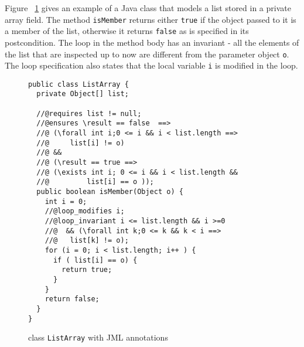 Figure ~\ref{halfSrc} gives an example of a Java class that models a list stored in a private array field. 
The method \texttt{isMember} returns either \texttt{true} if the object passed to it is a member of the list, otherwise 
it returns \texttt{false} as is specified in its postcondition. The loop in the method body has an invariant - all
the elements of the list that are inspected up to now are different from the parameter object \texttt{o}. The loop specification also states
that the local variable \texttt{i} is modified in the loop.
 
\begin{figure}[ht!]
\begin{verbatim}
public class ListArray {
  private Object[] list;

  //@requires list != null;
  //@ensures \result == false  ==>
  //@ (\forall int i;0 <= i && i < list.length ==> 
  //@     list[i] != o) 
  //@ && 
  //@ (\result == true ==> 
  //@ (\exists int i; 0 <= i && i < list.length && 
  //@         list[i] == o )); 
  public boolean isMember(Object o) {
    int i = 0;
    //@loop_modifies i;
    //@loop_invariant i <= list.length && i >=0 
    //@  && (\forall int k;0 <= k && k < i ==> 
    //@   list[k] != o); 
    for (i = 0; i < list.length; i++ ) {
      if ( list[i] == o) {
        return true;	
      }
    }
    return false;
  }
}
\end{verbatim}
\caption{class \texttt{ListArray} with JML annotations} 
\label{halfSrc}
\end{figure}


